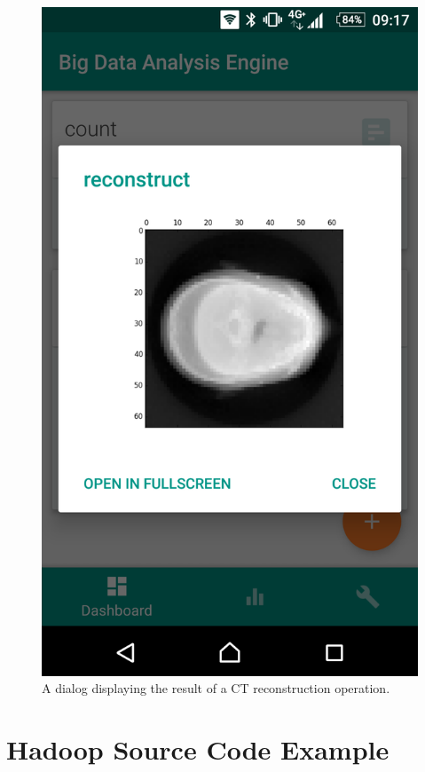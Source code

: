 \begin{figure}[h!]
\begin{minipage}[b]{0.4\textwidth}
    		\includegraphics[width=\textwidth]{img/result.png}
    		\caption[]{A dialog displaying the result of a CT reconstruction operation.}
  	\end{minipage}
\end{figure}

\chapter{Hadoop Source Code Example}

